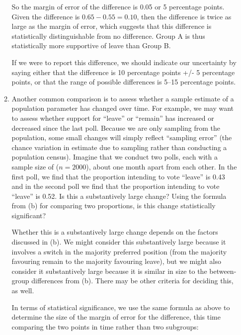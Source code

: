 \documentclass[a4paper]{exam}
\begin{document}
\begin{enumerate}
\begin{enumerate}
\begin{solution}
	So the margin of error of the difference is 0.05 or 5 percentage points. Given the difference is $0.65 - 0.55 = 0.10$, then the difference is twice as large as the margin of error, which suggests that this difference is statistically distinguishable from no difference. Group A is thus statistically more supportive of leave than Group B.
	
	If we were to report this difference, we should indicate our uncertainty by saying either that the difference is 10 percentage points +/- 5 percentage points, or that the range of possible differences is 5--15 percentage points.
	
	\end{solution}
	
	\item Another common comparison is to assess whether a sample estimate of a population parameter has changed over time. For example, we may want to assess whether support for ``leave'' or ``remain'' has increased or decreased since the last poll. Because we are only sampling from the population, some small changes will simply reflect ``sampling error'' (the chance variation in estimate due to sampling rather than conducting a population census). Imagine that we conduct two polls, each with a sample size of ($n=2000$), about one month apart from each other. In the first poll, we find that the proportion intending to vote ``leave'' is 0.43 and in the second poll we find that the proportion intending to vote ``leave'' is 0.52. Is this a substantively large change? Using the formula from (b) for comparing two proportions, is this change statistically significant?
	
	\begin{solution}
	
	Whether this is a substantively large change depends on the factors discussed in (b). We might consider this substantively large because it involves a switch in the majority preferred position (from the majority favouring remain to the majority favouring leave), but we might also consider it substantively large because it is similar in size to the between-group differences from (b). There may be other criteria for deciding this, as well.
	
	In terms of statistical significance, we use the same formula as above to determine the size of the margin of error for the difference, this time comparing the two points in time rather than two subgroups:
	

\end{solution}
\end{enumerate}
\end{enumerate}
\end{document}
